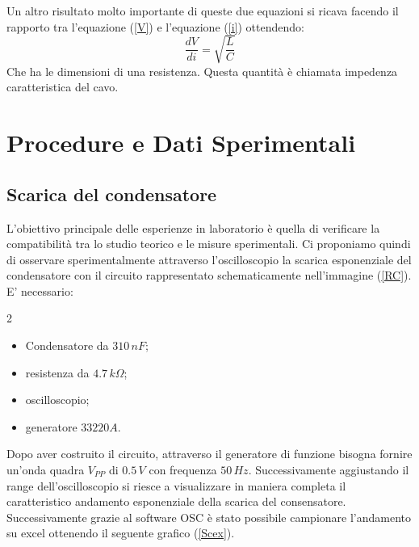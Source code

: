 \documentclass[11pt]{article}
\begin{document}
Un altro risultato molto importante di queste due equazioni si ricava facendo il rapporto tra l'equazione (\ref{V}) e l'equazione (\ref{i}) ottendendo:
\begin{equation}
    \frac{dV}{di}=\sqrt{\frac{L}{C}}
    \label{imp}
\end{equation}
Che ha le dimensioni di una resistenza. Questa quantità è chiamata impedenza caratteristica del cavo. 
\section{Procedure e Dati Sperimentali}
\subsection{Scarica del condensatore}
L'obiettivo principale delle esperienze in laboratorio è quella di verificare la compatibilità tra lo studio teorico e le misure sperimentali. Ci proponiamo quindi di osservare sperimentalmente attraverso l'oscilloscopio la scarica esponenziale del condensatore con il circuito rappresentato schematicamente nell'immagine (\ref{RC}). E' necessario:
\begin{multicols}{2}
\begin{itemize}
    \item Condensatore da $310\,nF$;
    \item resistenza da $4.7\,k\Omega$;
    \item oscilloscopio;
    \item generatore $33220A$.
\end{itemize}
\end{multicols}
Dopo aver costruito il circuito, attraverso il generatore di funzione bisogna fornire un'onda quadra $V_{PP}$ di $0.5\,V$ con frequenza $50\,Hz$. Successivamente aggiustando il range dell'oscilloscopio si riesce a visualizzare in maniera completa il caratteristico andamento esponenziale della scarica del consensatore. Successivamente grazie al software OSC è stato possibile campionare l'andamento su excel ottenendo il seguente grafico (\ref{Scex}).
\end{document}
